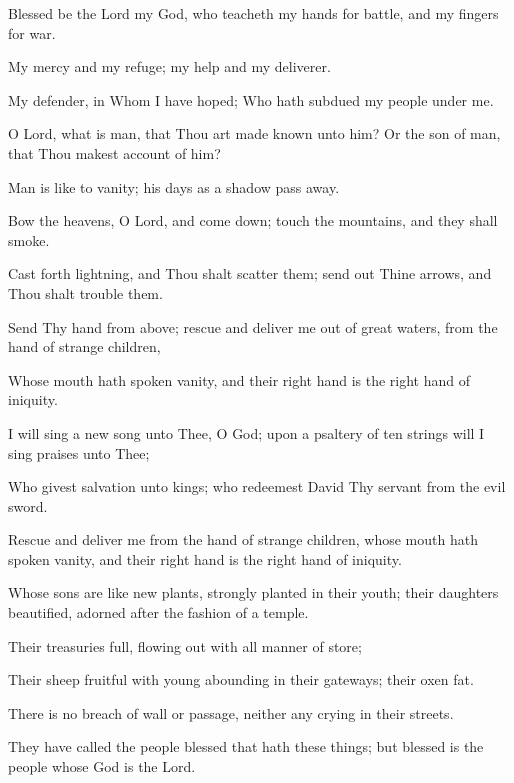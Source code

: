 Blessed be the Lord my God, who teacheth my hands for battle, and my fingers for war.

My mercy and my refuge; my help and my deliverer.

My defender, in Whom I have hoped; Who hath subdued my people under me.

O Lord, what is man, that Thou art made known unto him? Or the son of man, that Thou makest account of him?

Man is like to vanity; his days as a shadow pass away.

Bow the heavens, O Lord, and come down; touch the mountains, and they shall smoke.

Cast forth lightning, and Thou shalt scatter them; send out Thine arrows, and Thou shalt trouble them.

Send Thy hand from above; rescue and deliver me out of great waters, from the hand of strange children,

Whose mouth hath spoken vanity, and their right hand is the right hand of iniquity.

I will sing a new song unto Thee, O God; upon a psaltery of ten strings will I sing praises unto Thee;

Who givest salvation unto kings; who redeemest David Thy servant from the evil sword.

Rescue and deliver me from the hand of strange children, whose mouth hath spoken vanity, and their right hand is the right hand of iniquity.

Whose sons are like new plants, strongly planted in their youth; their daughters beautified, adorned after the fashion of a temple.

Their treasuries full, flowing out with all manner of store;

Their sheep fruitful with young abounding in their gateways; their oxen fat.

There is no breach of wall or passage, neither any crying in their streets.

They have called the people blessed that hath these things; but blessed is the people whose God is the Lord.
